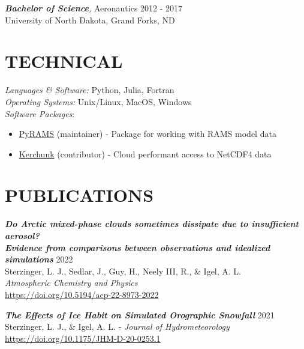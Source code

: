 \documentclass[overlapped]{res}
\begin{document}
\begin{resume}
                {\sl \textbf{Bachelor of Science},} Aeronautics 
                \hfill 2012 - 2017 \\
                University of North Dakota, Grand Forks, ND

\section{TECHNICAL} 
                {\sl Languages \& Software:} Python, Julia, Fortran \\
                {\sl Operating Systems:} Unix/Linux, MacOS, Windows\\
                {\sl Software Packages}:
                    \begin{itemize}
                        \item \href{https://github.com/lsterzinger/pyrams}{PyRAMS} (maintainer) - Package for working with RAMS model data
                        \item \href{https://github.com/fsspec/kerchunk}{Kerchunk} (contributor) - Cloud performant access to NetCDF4 data
                    \end{itemize}
                
\section{PUBLICATIONS}

    {\sl \textbf{Do Arctic mixed-phase clouds sometimes dissipate due to insufficient aerosol?\\Evidence from comparisons between observations and idealized simulations}}
    \hfill 2022 \\ Sterzinger, L. J., Sedlar, J., Guy, H., Neely III, R., \& Igel, A. L. \\ \textit{Atmospheric Chemistry and Physics} \\ \href{https://doi.org/10.5194/acp-22-8973-2022}{https://doi.org/10.5194/acp-22-8973-2022}

    {\sl \textbf{The Effects of Ice Habit on Simulated Orographic Snowfall}} 
    \hfill 2021 \\ Sterzinger, L. J., \& Igel, A. L. - \textit{Journal of Hydrometeorology} \\ \href{https://doi.org/10.1175/JHM-D-20-0253.1}{https://doi.org/10.1175/JHM-D-20-0253.1}




\end{resume}
\end{document}
